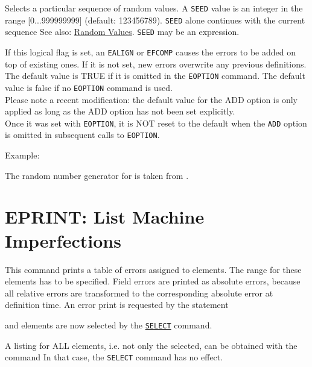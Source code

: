 \begin{madlist}
   Selects a particular sequence of random values. 
  A {\tt SEED} value is an integer in the range [0...999999999] (default:
  123456789). {\tt SEED} alone continues with the current sequence See
  also: \hyperref[sec:random]{Random Values}. {\tt SEED} may be an expression.  

   If this logical flag is set, an {\tt EALIGN} or {\tt EFCOMP} 
  causes the errors to be added on top of existing ones. If it is not set,
  new errors overwrite any previous definitions. The default value is
  TRUE if it is omitted in the {\tt EOPTION} command. The default value is
  false if no {\tt EOPTION} command is used.  
  \\Please note a recent modification: the default value for the ADD
  option is only applied as long as the ADD option has not been set
  explicitly. 
  \\Once it was set with {\tt EOPTION}, it is NOT reset to the default when
  the {\tt ADD} option is omitted in subsequent calls to {\tt EOPTION}.  
\end{madlist}

Example: 

The random number generator for \madx is taken from
\cite{knuth1981}. 


%

\section{EPRINT: List Machine Imperfections}  
\label{sec:eprint}
This command prints a table of errors assigned to elements. The range
for these elements has to be specified. Field errors are printed as
absolute errors, because all relative errors are transformed to the
corresponding absolute error at definition time. An error print is
requested by the statement  

and elements are now selected by the
\hyperref[sec:select]{\tt SELECT} command.  

A listing for ALL elements, i.e. not only the selected, can be obtained
with the command  
In that case, the {\tt SELECT} command has no effect.


